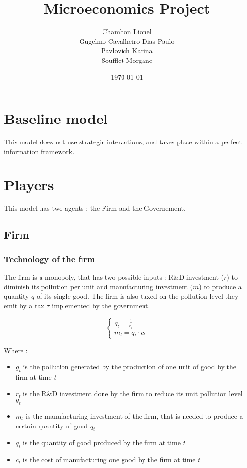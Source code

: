 \documentclass{article}
\title{Microeconomics Project}
\author{Chambon Lionel \\ Gugelmo Cavalheiro Dias Paulo \\ Pavlovich Karina \\ Soufflet Morgane}
\date{\today}
\begin{document}
\maketitle

\begin{abstract}
    
\end{abstract}
\pagebreak
\tableofcontents
\pagebreak
\section{Baseline model}

This model does not use strategic interactions, and takes place within a perfect information framework. 

\section{Players}

This model has two agents : the Firm and the Governement. 

\subsection{Firm}

\subsubsection{Technology of the firm}

The firm is a monopoly, that has two possible inputs : R\&D investment ($r$) to diminish its pollution per unit and manufacturing investment ($m$) to produce a quantity $q$ of its single good. The firm is also taxed on the pollution level they emit by a tax $\tau$ implemented by the government.

\begin{equation}
    \begin{cases}
        g_{t}=\frac{1}{r_{t}} \\
        m_{t} = q_{t}\cdot c_{t}
    \end{cases}
\end{equation}

Where : 
\begin{itemize}
    \item $g_{t}$ is the pollution generated by the production of one unit of good by the firm at time $t$
    \item $r_{t}$ is the R\&D investment done by the firm to reduce its unit pollution level $g_{t}$
    \item $m_{t}$ is the manufacturing investment of the firm, that is needed to produce a certain quantity of good $q_{t}$
    \item $q_{t}$ is the quantity of good produced by the firm at time $t$
    \item $c_{t}$ is the cost of manufacturing one good by the firm at time $t$
\end{itemize}
\end{document}

